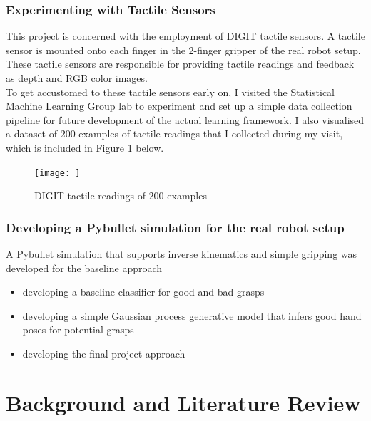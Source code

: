 \documentclass[a4paper]{report}
\begin{document}
\subsection{Experimenting with Tactile Sensors}
\label{sec:1.3.1}
This project is concerned with the employment of DIGIT tactile sensors. A tactile sensor is mounted onto each finger in the 2-finger gripper of the real robot setup. These tactile sensors are responsible for providing tactile readings and feedback as depth and RGB color images.\\

To get accustomed to these tactile sensors early on, I visited the Statistical Machine Learning Group lab to experiment and set up a simple data collection pipeline for future development of the actual learning framework. I also visualised a dataset of 200 examples of tactile readings that I collected during my visit, which is included in Figure 1 below.
\begin{figure}
    \centering
    \texttt{[image: ]}
    \caption{DIGIT tactile readings of 200 examples}
    \label{fig:digit\_readings}
\end{figure}

\subsection{Developing a Pybullet simulation for the real robot setup}
A Pybullet simulation that supports inverse kinematics and simple gripping was developed for the baseline approach 

\begin{itemize}
    \item developing a baseline classifier for good and bad grasps
    \item developing a simple Gaussian process generative model that infers good hand poses for potential grasps
    \item developing the final project approach
\end{itemize}


\chapter{Background and Literature Review}
\label{chap:2}
\end{document}
